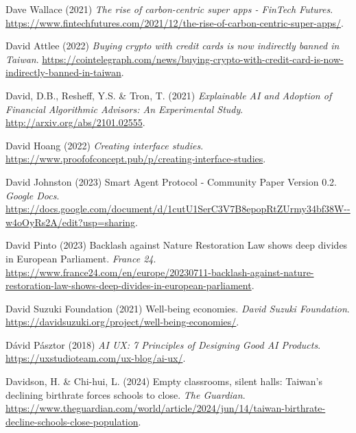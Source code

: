 \documentclass[
  letterpaper,
  DIV=11,
  numbers=noendperiod]{scrartcl}
\newlength{\cslhangindent}
\newenvironment{CSLReferences}[2] %
 {\begin{list}{}{%
  \setlength{\itemindent}{0pt}
  \setlength{\leftmargin}{0pt}
  \setlength{\parsep}{0pt}
  \ifodd #1
   \setlength{\leftmargin}{\cslhangindent}
   \setlength{\itemindent}{-1\cslhangindent}
  \fi
  \setlength{\itemsep}{#2\baselineskip}}}
 {\end{list}}
\begin{document}
\begin{CSLReferences}{0}{1}
Dave Wallace (2021) \emph{The rise of carbon-centric super apps -
{FinTech Futures}}.
\url{https://www.fintechfutures.com/2021/12/the-rise-of-carbon-centric-super-apps/}.

David Attlee (2022) \emph{Buying crypto with credit cards is now
indirectly banned in {Taiwan}}.
\url{https://cointelegraph.com/news/buying-crypto-with-credit-card-is-now-indirectly-banned-in-taiwan}.

David, D.B., Resheff, Y.S. \& Tron, T. (2021) \emph{Explainable {AI} and
{Adoption} of {Financial Algorithmic Advisors}: An {Experimental
Study}}. \url{http://arxiv.org/abs/2101.02555}.

David Hoang (2022) \emph{Creating interface studies}.
\url{https://www.proofofconcept.pub/p/creating-interface-studies}.

David Johnston (2023) Smart {Agent Protocol} - {Community Paper Version}
0.2. \emph{Google Docs}.
\url{https://docs.google.com/document/d/1cutU1SerC3V7B8epopRtZUrmy34bf38W--w4oOyRs2A/edit?usp=sharing}.

David Pinto (2023) Backlash against {Nature Restoration Law} shows deep
divides in {European Parliament}. \emph{France 24}.
\url{https://www.france24.com/en/europe/20230711-backlash-against-nature-restoration-law-shows-deep-divides-in-european-parliament}.

David Suzuki Foundation (2021) Well-being economies. \emph{David Suzuki
Foundation}.
\url{https://davidsuzuki.org/project/well-being-economies/}.

Dávid Pásztor (2018) \emph{{AI UX}: 7 {Principles} of {Designing Good AI
Products}}. \url{https://uxstudioteam.com/ux-blog/ai-ux/}.

Davidson, H. \& Chi-hui, L. (2024) Empty classrooms, silent halls:
{Taiwan}'s declining birthrate forces schools to close. \emph{The
Guardian}.
\url{https://www.theguardian.com/world/article/2024/jun/14/taiwan-birthrate-decline-schools-close-population}.


\end{CSLReferences}
\end{document}
